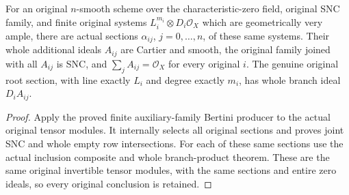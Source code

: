 \begin{theorem}
\label{thm:kn-nadel-very-ample-auxiliary-branch-family}
\leanok
{}
For an original $n$-smooth scheme over the characteristic-zero field, original
SNC family, and finite original systems $L_i^{m_i}\otimes D_i\mathcal O_X$
which are geometrically very ample, there are actual sections $\alpha_{ij}$,
$j=0,\ldots,n$, of these same systems. Their whole additional ideals $A_{ij}$
are Cartier and smooth, the original family joined with all $A_{ij}$ is SNC,
and $\sum_j A_{ij}=\mathcal O_X$ for every original $i$. The genuine original
root section, with line exactly $L_i$ and degree exactly $m_i$, has whole
branch ideal $D_i A_{ij}$.
\end{theorem}
\begin{proof}
Apply the proved finite auxiliary-family Bertini producer to the actual
original tensor modules. It internally selects all original sections and
proves joint SNC and whole empty row intersections. For each of these same
sections use the actual inclusion composite and whole branch-product theorem.
These are the same original invertible tensor modules, with the same
sections and entire zero ideals, so every original conclusion is retained.
\end{proof}

